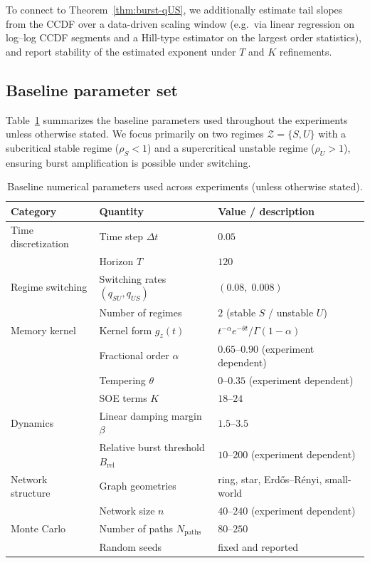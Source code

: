 \documentclass[12pt,a4paper]{article}
\theoremstyle{plain}
\theoremstyle{definition}
\theoremstyle{remark}
\begin{document}
To connect to Theorem~\ref{thm:burst-qUS}, we additionally estimate tail slopes from the CCDF over a data-driven scaling window
(e.g.\ via linear regression on log--log CCDF segments and a Hill-type estimator on the largest order statistics), and report stability
of the estimated exponent under $T$ and $K$ refinements.

\subsection{Baseline parameter set}
\label{subsec:num-baseline}

Table~\ref{tab:num-params} summarizes the baseline parameters used throughout the experiments unless otherwise stated.
We focus primarily on two regimes $\mathcal Z=\{S,U\}$ with a subcritical stable regime ($\rho_S<1$) and a supercritical unstable
regime ($\rho_U>1$), ensuring burst amplification is possible under switching.

\begin{table}[H]
	\centering
	\caption{Baseline numerical parameters used across experiments (unless otherwise stated).}
	\label{tab:num-params}
	\begin{tabular}{@{}lll@{}}
		\toprule
		Category & Quantity & Value / description \\
		\midrule
		Time discretization
		& Time step $\Delta t$
		& $0.05$ \\
		& Horizon $T$
		& $120$ \\
		\midrule
		Regime switching
		& Switching rates $(q_{SU},q_{US})$
		& $(0.08,\;0.008)$ \\
		& Number of regimes
		& $2$ (stable $S$ / unstable $U$) \\
		\midrule
		Memory kernel
		& Kernel form $g_z(t)$
		& $t^{-\alpha} e^{-\theta t}/\Gamma(1-\alpha)$ \\
		& Fractional order $\alpha$
		& $0.65$--$0.90$ (experiment dependent) \\
		& Tempering $\theta$
		& $0$--$0.35$ (experiment dependent) \\
		& SOE terms $K$
		& $18$--$24$ \\
		\midrule
		Dynamics
		& Linear damping margin $\beta$
		& $1.5$--$3.5$ \\
		& Relative burst threshold $B_{\mathrm{rel}}$
		& $10$--$200$ (experiment dependent) \\
		\midrule
		Network structure
		& Graph geometries
		& ring, star, Erd\H{o}s--R\'enyi, small-world \\
		& Network size $n$
		& $40$--$240$ (experiment dependent) \\
		\midrule
		Monte Carlo
		& Number of paths $N_{\mathrm{paths}}$
		& $80$--$250$ \\
		& Random seeds
		& fixed and reported \\
		\bottomrule
	\end{tabular}
\end{table}
\end{document}
